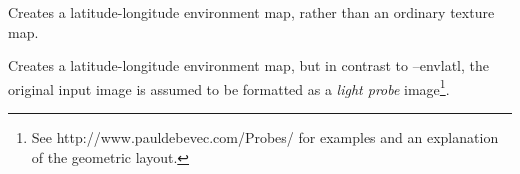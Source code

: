 Creates a latitude-longitude environment map, rather than an ordinary
texture map.
\apiend

Creates a latitude-longitude environment map, but in contrast to
{\cf --envlatl}, the original input image is assumed to be formatted
as a \emph{light probe} image\footnote{See
{\cf http://www.pauldebevec.com/Probes/} for examples and an explanation
of the geometric layout.}.
\apiend




\begin{comment}

\section{{\cf maketx} Recipes}


This section will give quick examples of common uses of {\cf maketx}.

\subsection*{Converting between file formats}

It's a snap to converting among image formats supported by \product
(i.e., for which \ImageInput and \ImageOutput plugins can be found).
The {\cf maketx} utility will simply infer the file format from the
file extension. The following example converts a PNG image to JPEG:

\begin{code}
    maketx lena.png lena.jpg
\end{code}

\end{comment}
